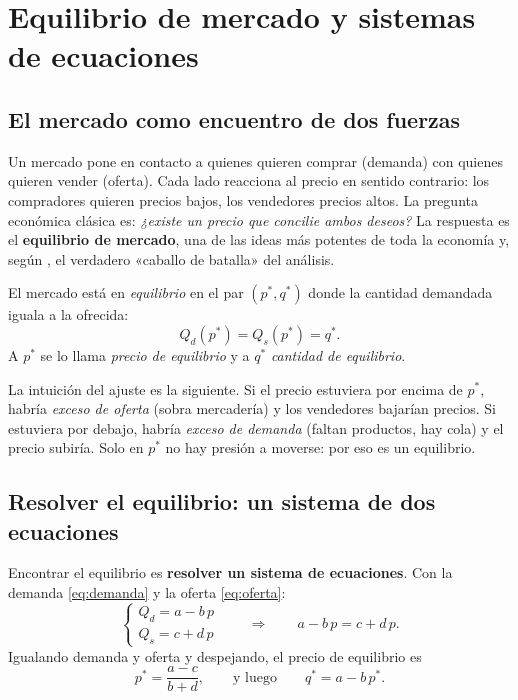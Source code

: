\chapter{Equilibrio de mercado y sistemas de ecuaciones}
\label{cap:equilibrio}

\section{El mercado como encuentro de dos fuerzas}

Un mercado pone en contacto a quienes quieren comprar (demanda) con quienes quieren vender (oferta). Cada lado reacciona al precio en sentido contrario: los compradores quieren precios bajos, los vendedores precios altos. La pregunta económica clásica es: \emph{¿existe un precio que concilie ambos deseos?} La respuesta es el \textbf{equilibrio de mercado}, una de las ideas más potentes de toda la economía y, según \cite{mankiw}, el verdadero «caballo de batalla» del análisis.

\begin{definicion}
El mercado está en \emph{equilibrio} en el par $(p^{*},q^{*})$ donde la cantidad demandada iguala a la ofrecida:
\[
Q_d(p^{*}) = Q_s(p^{*}) = q^{*}.
\]
A $p^{*}$ se lo llama \emph{precio de equilibrio} y a $q^{*}$ \emph{cantidad de equilibrio}.
\end{definicion}

La intuición del ajuste es la siguiente. Si el precio estuviera por encima de $p^{*}$, habría \emph{exceso de oferta} (sobra mercadería) y los vendedores bajarían precios. Si estuviera por debajo, habría \emph{exceso de demanda} (faltan productos, hay cola) y el precio subiría. Solo en $p^{*}$ no hay presión a moverse: por eso es un equilibrio.

\section{Resolver el equilibrio: un sistema de dos ecuaciones}

Encontrar el equilibrio es \textbf{resolver un sistema de ecuaciones}. Con la demanda \eqref{eq:demanda} y la oferta \eqref{eq:oferta}:
\begin{equation}
\begin{cases}
Q_d = a - b\,p \\[2pt]
Q_s = c + d\,p
\end{cases}
\qquad\Longrightarrow\qquad a - b\,p = c + d\,p .
\end{equation}
Igualando demanda y oferta y despejando, el precio de equilibrio es
\begin{equation}
p^{*} = \frac{a-c}{b+d}, \qquad\text{y luego}\qquad q^{*} = a - b\,p^{*}.
\label{eq:p_equilibrio}
\end{equation}


